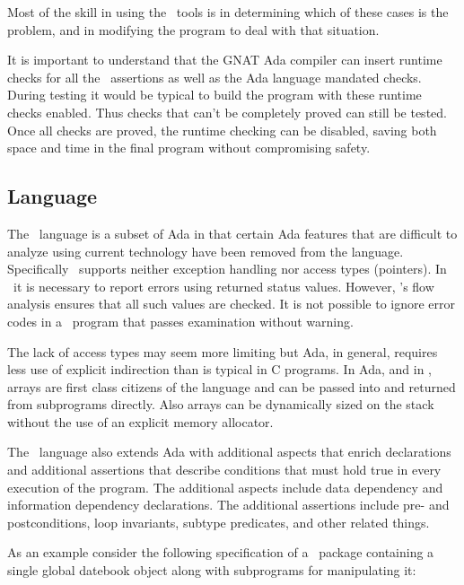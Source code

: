 Most of the skill in using the \SPARK\ tools is in determining which of these cases is the
problem, and in modifying the program to deal with that situation.

It is important to understand that the GNAT Ada compiler can insert runtime checks for all the
\SPARK\ assertions as well as the Ada language mandated checks. During testing it would be
typical to build the program with these runtime checks enabled. Thus checks that can't be
completely proved can still be tested. Once all checks are proved, the runtime checking can be
disabled, saving both space and time in the final program without compromising safety.

\subsection{Language}
\label{sec:spark2014-language}

The \SPARK\ language is a subset of Ada in that certain Ada features that are difficult to
analyze using current technology have been removed from the language. Specifically \SPARK\
supports neither exception handling nor access types (pointers). In \SPARK\ it is necessary to
report errors using returned status values. However, \SPARK's flow analysis ensures that all
such values are checked. It is not possible to ignore error codes in a \SPARK\ program that
passes examination without warning.

The lack of access types may seem more limiting but Ada, in general, requires less use of
explicit indirection than is typical in C programs. In Ada, and in \SPARK, arrays are first
class citizens of the language and can be passed into and returned from subprograms directly.
Also arrays can be dynamically sized on the stack without the use of an explicit memory
allocator.

The \SPARK\ language also extends Ada with additional aspects that enrich declarations and
additional assertions that describe conditions that must hold true in every execution of the
program. The additional aspects include data dependency and information dependency declarations.
The additional assertions include pre- and postconditions, loop invariants, subtype predicates,
and other related things.

As an example consider the following specification of a \SPARK\ package containing a single
global datebook object along with subprograms for manipulating it:

